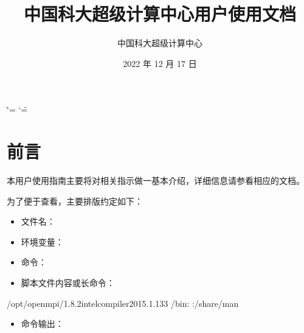 \documentclass[a4paper,12pt,english]{sphinxmanual}
\title{中国科大超级计算中心用户使用文档}
\date{2022 年 12 月 17 日}
\author{中国科大超级计算中心}
\begin{document}
\ifdefined\shorthandoff
  \ifnum\catcode`\=\string=\active\shorthandoff{=}\fi
  \ifnum\catcode`\"=\active{}\fi
\fi

\pagestyle{empty}
\sphinxmaketitle
\pagestyle{plain}
\sphinxtableofcontents
\pagestyle{normal}
\label{\detokenize{index::doc}}


\sphinxstepscope


\chapter{前言}
\label{\detokenize{preface:id1}}\label{\detokenize{preface::doc}}
\sphinxAtStartPar
本用户使用指南主要将对相关指示做一基本介绍，详细信息请参看相应的文档。

\sphinxAtStartPar
为了便于查看，主要排版约定如下：
\begin{itemize}
\item {} 
\sphinxAtStartPar
文件名：

\item {} 
\sphinxAtStartPar
环境变量： 

\item {} 
\sphinxAtStartPar
命令：

\item {} 
\sphinxAtStartPar
脚本文件内容或长命令：

\end{itemize}

\begin{sphinxVerbatim}[commandchars=\\\{\}]
 /opt/openmpi/1.8.2\PYGZus{}intel\PYGZhy{}compiler\PYGZhy{}2015.1.133
 /bin:
 :/share/man
\end{sphinxVerbatim}
\begin{itemize}
\item {} 
\sphinxAtStartPar
命令输出：

\end{itemize}
\end{document}
